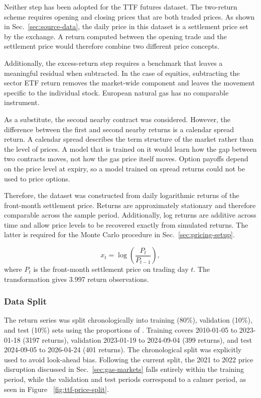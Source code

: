 Neither step has been adopted for the TTF futures dataset. The two-return scheme requires opening and closing prices that are both traded prices. As shown in Sec.~\ref{sec:source-data}, the daily price in this dataset is a settlement price set by the exchange. A return computed between the opening trade and the settlement price would therefore combine two different price concepts.

Additionally, the excess-return step requires a benchmark that leaves a meaningful residual when subtracted. In the case of equities, subtracting the sector ETF return removes the market-wide component and leaves the movement specific to the individual stock. European natural gas has no comparable instrument.

As a substitute, the second nearby contract was considered. However, the difference between the first and second nearby returns is a calendar spread return. A calendar spread describes the term structure of the market rather than the level of prices. A model that is trained on it would learn how the gap between two contracts moves, not how the gas price itself moves. Option payoffs depend on the price level at expiry, so a model trained on spread returns could not be used to price options.

Therefore, the dataset was constructed from daily logarithmic returns of the front-month settlement price. Returns are approximately stationary and therefore comparable across the sample period. Additionally, log returns are additive across time and allow price levels to be recovered exactly from simulated returns. The latter is required for the Monte Carlo procedure
in Sec.~\ref{sec:pricing-setup}.

\begin{equation}\label{eq:logreturn}
    x_t = \log\!\left(\frac{P_t}{P_{t-1}}\right),
\end{equation}
where $P_t$ is the front-month settlement price on trading day $t$.
The transformation gives 3.997 return observations.

\subsubsection{Data Split}
The return series was split chronologically into training (80\%), validation (10\%), and test (10\%) sets using the proportions of \parencite{vuleticFinGANForecastingClassifying2024}. Training covers 2010-01-05 to 2023-01-18
(\num{3197} returns), validation 2023-01-19 to 2024-09-04 (\num{399} returns), and test
2024-09-05 to 2026-04-24 (401 returns). The chronological split was explicitly used to avoid look-ahead bias. Following the current split, the 2021 to 2022 price disruption discussed in Sec.~\ref{sec:gas-markets} falls entirely within the training period, while the validation and test periods correspond to a calmer period, as seen in Figure ~\ref{fig:ttf-price-split}.

